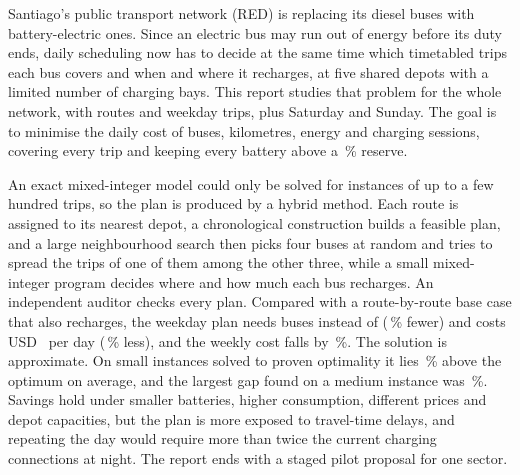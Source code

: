 Santiago's public transport network (RED) is replacing its diesel buses with battery-electric ones. Since an electric bus may run out of energy before its duty ends, daily scheduling now has to decide at the same time which timetabled trips each bus covers and when and where it recharges, at five shared depots with a limited number of charging bays. This report studies that problem for the whole network, with \RutasLaboralEn{} routes and \CorridasLaboralEn{} weekday trips, plus Saturday and Sunday. The goal is to minimise the daily cost of buses, kilometres, energy and charging sessions, covering every trip and keeping every battery above a \PctReserva\,\% reserve.

An exact mixed-integer model could only be solved for instances of up to a few hundred trips, so the plan is produced by a hybrid method. Each route is assigned to its nearest depot, a chronological construction builds a feasible plan, and a large neighbourhood search then picks four buses at random and tries to spread the trips of one of them among the other three, while a small mixed-integer program decides where and how much each bus recharges. An independent auditor checks every plan. Compared with a route-by-route base case that also recharges, the weekday plan needs \BusesPlanLaboralEn{} buses instead of \BusesBaseLaboralEn{} (\BajaBusesLaboralEn\,\% fewer) and costs USD~\CostoPlanLaboralEn{} per day (\BajaCostoLaboralEn\,\% less), and the weekly cost falls by \BajaSemanaEn\,\%. The solution is approximate. On small instances solved to proven optimality it lies \BrechaCuartetosEn\,\% above the optimum on average, and the largest gap found on a medium instance was \BrechaCuartetosRutasOchoEn\,\%. Savings hold under smaller batteries, higher consumption, different prices and depot capacities, but the plan is more exposed to travel-time delays, and repeating the day would require more than twice the current charging connections at night. The report ends with a staged pilot proposal for one sector.
